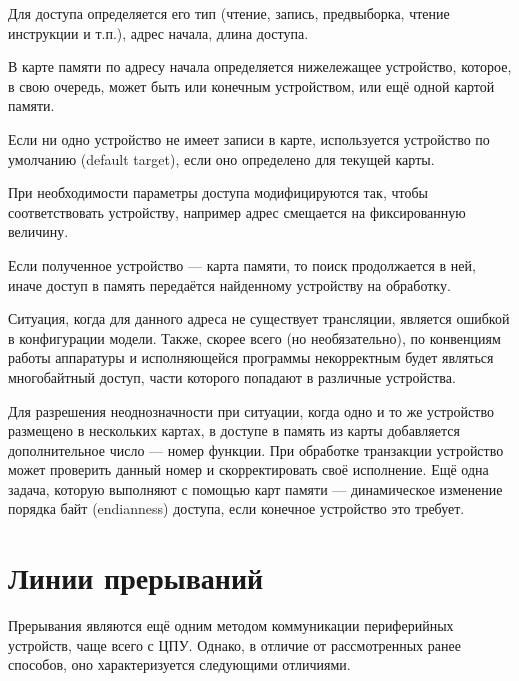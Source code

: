 \begin{enumerate*}
\item Для доступа определяется его тип (чтение, запись, предвыборка, чтение инструкции и т.п.), адрес начала, длина доступа.
\item В карте памяти по адресу начала определяется нижележащее устройство, которое, в свою очередь, может быть или конечным устройством, или ещё одной картой памяти.
\item Если ни одно устройство не имеет записи в карте, используется устройство по умолчанию (\abbr default target), если оно определено для текущей карты.
\item При необходимости параметры доступа модифицируются так, чтобы соответствовать устройству, например адрес смещается на фиксированную величину.
\item Если полученное устройство --- карта памяти, то поиск продолжается в ней, иначе доступ в память передаётся найденному устройству на обработку. 
\item Ситуация, когда для данного адреса не существует трансляции, является ошибкой в конфигурации модели. Также, скорее всего (но необязательно), по конвенциям работы аппаратуры и исполняющейся программы некорректным будет являться многобайтный доступ, части которого попадают в различные устройства.
\end{enumerate*}

Для разрешения неоднозначности при ситуации, когда одно и то же устройство размещено в нескольких картах, в доступе в память из карты добавляется дополнительное число --- номер функции. При обработке транзакции устройство может проверить данный номер и скорректировать своё исполнение. Ещё одна задача, которую выполняют с помощью карт памяти --- динамическое изменение порядка байт (endianness) доступа, если конечное устройство это требует.

\section{Линии прерываний}

Прерывания являются ещё одним методом коммуникации пери\-фе\-рий\-ных устройств, чаще всего с ЦПУ. Однако, в отличие от рассмотренных ранее способов, оно характеризуется следующими отличиями.


